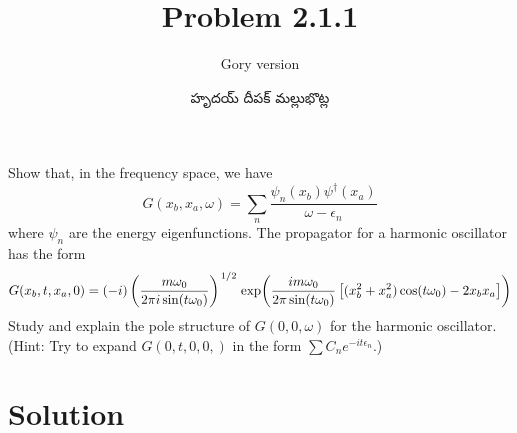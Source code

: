\documentclass{article}
\title{Problem 2.1.1}
\subtitle{Gory version}
\author{\begin{telugu}హృదయ్ దీపక్ మల్లుభొట్ల\end{telugu}}
\begin{document}
	\maketitle
	Show that, in the frequency space, we have
	\begin{equation}
		G(x_b, x_a, \omega) = \sum_n \frac{\psi_n(x_b) \psi^\dagger(x_a)}{\omega - \epsilon_n} \label{eq:target1}
	\end{equation}
	where $\psi_n$ are the energy eigenfunctions.
	The propagator for a harmonic oscillator has the form
	\begin{equation}
		G(x_b, t, x_a, 0) = (-i) \left( \frac{m \omega_0}{2 \pi i \sin(t \omega_0)} \right)^{\flatfrac12} \exp(\frac{i m \omega_0}{2 \pi \sin(t\omega_0)}\left[(x_b^2 + x_a^2)\cos(t \omega_0) - 2 x_b x_a \right]) \label{eq:harmonicoscprop}
	\end{equation}
	Study and explain the pole structure of $G(0, 0, \omega)$ for the harmonic oscillator.
	(Hint: Try to expand $G(0, t, 0, 0,)$ in the form $\sum C_n e^{-i t \epsilon_n}$.)

	\section{Solution} \label{sec:solution}
\end{document}
